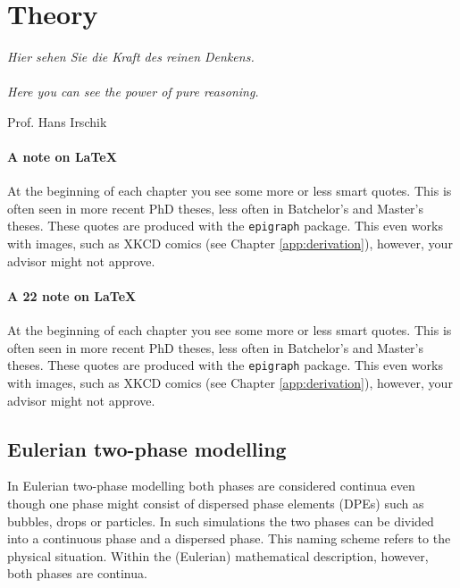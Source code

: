 \chapter{Theory}
\label{sec:theory}

\epigraph{
	\textit{Hier sehen Sie die Kraft des reinen Denkens.} \\
	\hspace{1ex}\\
	\textit{Here you can see the power of pure reasoning.}
}{Prof. Hans Irschik}
		



\subsubsection*{A note on \LaTeX{}}

At the beginning of each chapter you see some more or less smart quotes. This is often seen 
in more recent PhD theses, less often in Batchelor's and Master's theses. These quotes are 
produced with the \verb+epigraph+ package. This even works with images, such as XKCD comics 
(see Chapter \ref{app:derivation}), however, your advisor might not approve.

\subsubsection*{A 22 note on \LaTeX{}}

At the beginning of each chapter you see some more or less smart quotes. This is often seen 
in more recent PhD theses, less often in Batchelor's and Master's theses. These quotes are 
produced with the \verb+epigraph+ package. This even works with images, such as XKCD comics 
(see Chapter \ref{app:derivation}), however, your advisor might not approve.

\section{Eulerian two-phase modelling}

In Eulerian two-phase modelling both phases are considered continua even though 
one phase might consist of dispersed phase elements (\acp{DPE}) such as bubbles, drops 
or particles. In such simulations the two phases can be divided into a 
continuous phase and a dispersed phase. This naming scheme refers to the physical 
situation. Within the (Eulerian) mathematical description, however, both phases 
are continua.


